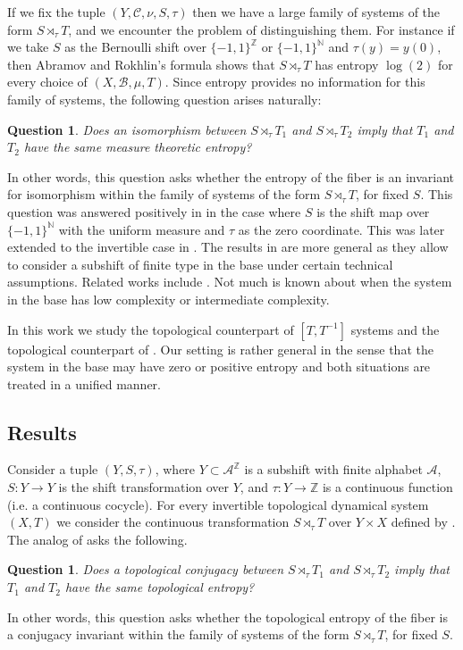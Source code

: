 \documentclass[a4paper,oneside]{amsart}
\renewcommand{\(}{\begin{dmath*}}
\renewcommand{\)}{\end{dmath*}}
\newtheorem{question}[theorem]{Question}
\theoremstyle{definition}
\newcommand{\N}{\mathbb{N}}
\newcommand{\Z}{\mathbb{Z}}
\newcommand{\A}{\mathcal{A}}
\begin{document}
If we fix the tuple $(Y,\mathcal C,\nu,S,\tau)$ then we have a large family of systems of the form $S\rtimes_\tau T$, and we encounter the problem of distinguishing them. For instance if we take $S$ as the Bernoulli shift over $\{-1,1\}^\Z$ or $\{-1,1\}^\N$ and $\tau(y)=y(0)$, then Abramov and Rokhlin's formula \cite{abramov_entropy_1965} shows that $S\rtimes_\tau T$ has entropy $\log(2)$ for every choice of $(X,\mathcal B,\mu, T)$. Since entropy provides no information for this family of systems, the following question arises naturally:
\begin{question}\label{question}
Does an isomorphism between $S\rtimes_\tau T_1$ and $S\rtimes_\tau  T_2$  imply that $T_1$ and $T_2$ have the same measure theoretic entropy?
\end{question} 
In other words, this question asks whether the entropy of the fiber is an  invariant for isomorphism within the family of systems of the form $S\rtimes_\tau T$, for fixed $S$. This question was answered positively in \cite{heicklen_entropy_2000} in the case where $S$ is  the shift map over $\{-1,1\}^\N$ with the uniform measure and $\tau$ as the zero coordinate. This was later extended to the invertible case in \cite{austin_scenery_2014}. The results in \cite{austin_scenery_2014} are more general as they allow to consider a subshift of finite type in the base  under certain technical assumptions. Related works include \cite{aaronson_relative_2012,ball_entropy_2003}. Not much is known about  when the system in the base has low complexity or intermediate complexity. 

In this work we study the topological counterpart of $[T,T^{-1}]$ systems and the topological counterpart of . Our setting is rather general in the sense that the system in the base may have zero or positive entropy and both situations are treated in a unified manner. 
\subsection{Results}
Consider a tuple $(Y,S,\tau)$, where $Y\subset \A^\Z$ is a subshift with finite alphabet $\A$, $S\colon Y\to Y$ is the shift transformation over $Y$, and $\tau\colon Y\to \Z$ is a continuous function (i.e. a continuous cocycle). For every invertible topological dynamical system $(X,T)$ we consider the continuous transformation $S\rtimes_\tau T$ over $Y\times X$ defined by . The analog of  asks the following.
\begin{question}\label{question-topological}
    Does a topological conjugacy between $S\rtimes_\tau T_1$ and $S\rtimes_\tau T_2$ imply that $T_1$ and $T_2$ have the same topological entropy?
\end{question}
In other words, this question asks whether the topological entropy of the fiber is a conjugacy invariant within the family of systems of the form $S\rtimes_\tau T$, for fixed $S$.
 
\end{document}
